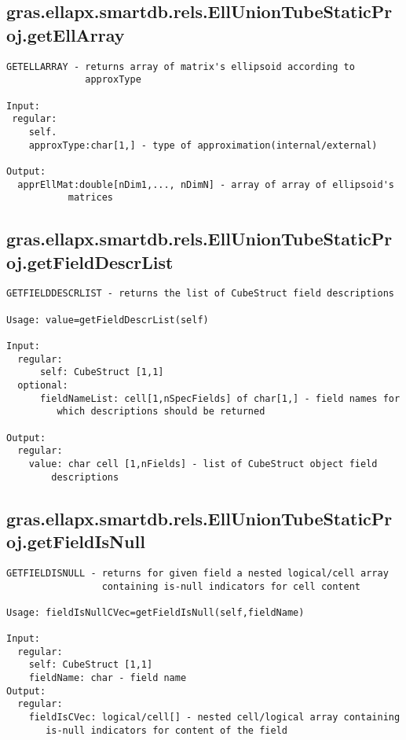\subsection{\texorpdfstring{gras.ellapx.smartdb.rels.EllUnionTubeStaticProj.getEllArray}{getEllArray}}\label{method:gras.ellapx.smartdb.rels.EllUnionTubeStaticProj.getEllArray}
\begin{verbatim}
GETELLARRAY - returns array of matrix's ellipsoid according to
              approxType

Input:
 regular:
    self.
    approxType:char[1,] - type of approximation(internal/external)

Output:
  apprEllMat:double[nDim1,..., nDimN] - array of array of ellipsoid's
           matrices
\end{verbatim}
\subsection{\texorpdfstring{gras.ellapx.smartdb.rels.EllUnionTubeStaticProj.getFieldDescrList}{getFieldDescrList}}\label{method:gras.ellapx.smartdb.rels.EllUnionTubeStaticProj.getFieldDescrList}
\begin{verbatim}
GETFIELDDESCRLIST - returns the list of CubeStruct field descriptions

Usage: value=getFieldDescrList(self)

Input:
  regular:
      self: CubeStruct [1,1]
  optional:
      fieldNameList: cell[1,nSpecFields] of char[1,] - field names for
         which descriptions should be returned

Output:
  regular:
    value: char cell [1,nFields] - list of CubeStruct object field
        descriptions
\end{verbatim}
\subsection{\texorpdfstring{gras.ellapx.smartdb.rels.EllUnionTubeStaticProj.getFieldIsNull}{getFieldIsNull}}\label{method:gras.ellapx.smartdb.rels.EllUnionTubeStaticProj.getFieldIsNull}
\begin{verbatim}
GETFIELDISNULL - returns for given field a nested logical/cell array
                 containing is-null indicators for cell content

Usage: fieldIsNullCVec=getFieldIsNull(self,fieldName)

Input:
  regular:
    self: CubeStruct [1,1]
    fieldName: char - field name
Output:
  regular:
    fieldIsCVec: logical/cell[] - nested cell/logical array containing
       is-null indicators for content of the field
\end{verbatim}
